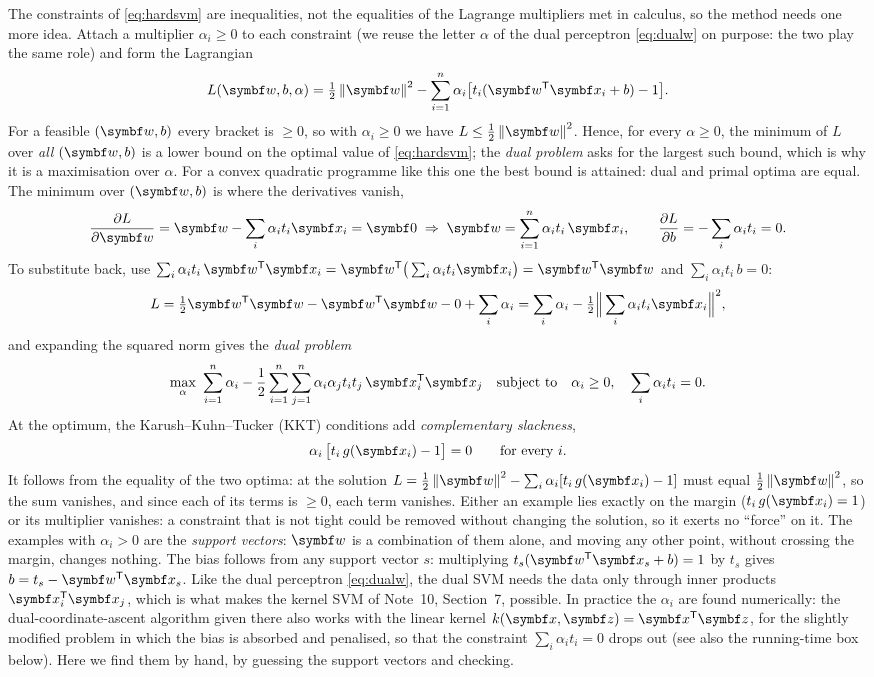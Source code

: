\documentclass[11pt]{article}
\newcommand{\w}{\vect{w}}
\begin{document}
The constraints of \eqref{eq:hardsvm} are inequalities, not the equalities of the Lagrange multipliers met in calculus,
so the method needs one more idea. Attach a multiplier $\alpha_i \ge 0$ to each constraint (we reuse the letter $\alpha$
of the dual perceptron \eqref{eq:dualw} on purpose: the two play the same role) and form the Lagrangian
\[
  L(\w, b, \alpha) = \tfrac12\norm{\w}^2 - \sum_{i=1}^n \alpha_i\big[t_i(\w\T\x_i + b) - 1\big] .
\]
For a feasible $(\w, b)$ every bracket is $\ge 0$, so with $\alpha_i \ge 0$ we have $L \le \frac12\norm{\w}^2$. Hence, for
every $\alpha \ge 0$, the minimum of $L$ over \emph{all} $(\w, b)$ is a lower bound on the optimal value of
\eqref{eq:hardsvm}; the \emph{dual problem} asks for the largest such bound, which is why it is a maximisation over
$\alpha$. For a convex quadratic programme like this one the best bound is attained: dual and primal optima are equal.
The minimum over $(\w, b)$ is where the derivatives vanish,
\[
  \frac{\partial L}{\partial \w} = \w - \sum_i \alpha_i t_i\x_i = \vect{0} \;\Rightarrow\; \w = \sum_{i=1}^n \alpha_i t_i\,\x_i ,
  \qquad \frac{\partial L}{\partial b} = -\sum_i \alpha_i t_i = 0 .
\]
To substitute back, use $\sum_i \alpha_i t_i\,\w\T\x_i = \w\T\big(\sum_i \alpha_i t_i\x_i\big) = \w\T\w$ and
$\sum_i \alpha_i t_i\,b = 0$:
\[
  L = \tfrac12\w\T\w - \w\T\w - 0 + \sum_i \alpha_i = \sum_i \alpha_i - \tfrac12\Big\|\sum_i \alpha_i t_i\x_i\Big\|^2 ,
\]
and expanding the squared norm gives the \emph{dual problem}
\begin{equation}\label{eq:svmdual}
  \max_{\alpha}\ \sum_{i=1}^n \alpha_i - \frac12\sum_{i=1}^n\sum_{j=1}^n \alpha_i\alpha_j t_i t_j\,\x_i\T\x_j
  \quad\text{subject to}\quad \alpha_i \ge 0, \quad \sum_i \alpha_i t_i = 0 .
\end{equation}
At the optimum, the Karush--Kuhn--Tucker (KKT) conditions add \emph{complementary slackness},
\[
  \alpha_i\,\big[t_i\,g(\x_i) - 1\big] = 0 \qquad \text{for every } i .
\]
It follows from the equality of the two optima: at the solution $L = \frac12\norm{\w}^2 - \sum_i
\alpha_i[t_i\,g(\x_i) - 1]$ must equal $\frac12\norm{\w}^2$, so the sum vanishes, and since each of its terms is $\ge 0$,
each term vanishes. Either an example lies exactly on the margin ($t_i\,g(\x_i) = 1$) or its multiplier vanishes: a
constraint that is not tight could be removed without changing the solution, so it exerts no ``force'' on it. The examples
with $\alpha_i > 0$ are the \emph{support vectors}: $\w$ is a combination of them alone, and moving any other point,
without crossing the margin, changes nothing. The bias follows from any support vector $s$: multiplying $t_s(\w\T\x_s + b) = 1$ by $t_s$ gives $b = t_s - \w\T\x_s$.
Like the dual perceptron \eqref{eq:dualw}, the dual SVM needs the data only through inner products $\x_i\T\x_j$, which is
what makes the kernel SVM of Note~10, Section~7, possible. In practice the $\alpha_i$ are found numerically: the
dual-coordinate-ascent algorithm given there also works with the linear kernel $k(\x, \vect{z}) = \x\T\vect{z}$, for the
slightly modified problem in which the bias is absorbed and penalised, so that the constraint $\sum_i\alpha_it_i = 0$ drops
out (see also the running-time box below). Here we find them by hand, by guessing the support vectors and checking.
\end{document}
